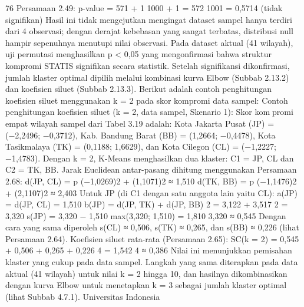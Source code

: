 76
Persamaan 2.49:
p-value =
571 + 1
1000 + 1
=
572
1001
= 0,5714 (tidak signifikan)
Hasil ini tidak mengejutkan mengingat dataset sampel hanya terdiri dari 4 observasi; dengan
derajat kebebasan yang sangat terbatas, distribusi null hampir sepenuhnya menutupi nilai
observasi. Pada dataset aktual (41 wilayah), uji permutasi menghasilkan p < 0,05 yang
mengonfirmasi bahwa struktur kompromi STATIS signifikan secara statistik.
Setelah signifikansi dikonfirmasi, jumlah klaster optimal dipilih melalui kombinasi
kurva Elbow (Subbab 2.13.2) dan koefisien siluet (Subbab 2.13.3). Berikut adalah contoh
penghitungan koefisien siluet menggunakan k = 2 pada skor kompromi data sampel:
Contoh penghitungan koefisien siluet (k = 2, data sampel, Skenario 1): Skor kompromi empat wilayah sampel dari Tabel 3.19 adalah: Kota Jakarta Pusat (JP) =
(−2,2496; −0,3712), Kab. Bandung Barat (BB) = (1,2664; −0,4478), Kota Tasikmalaya
(TK) = (0,1188; 1,6629), dan Kota Cilegon (CL) = (−1,2227; −1,4783). Dengan
k = 2, K-Means menghasilkan dua klaster: C1 = {JP, CL} dan C2 = {TK, BB}. Jarak
Euclidean antar-pasang dihitung menggunakan Persamaan 2.68:
d(JP, CL) = p
(−1,0269)2 + (1,1071)2 ≈ 1,510
d(TK, BB) = p
(−1,1476)2 + (2,1107)2 ≈ 2,403
Untuk JP (di C1 dengan satu anggota lain yaitu CL):
a(JP) = d(JP, CL) = 1,510
b(JP) = d(JP, TK) + d(JP, BB)
2
=
3,122 + 3,517
2
= 3,320
s(JP) = 3,320 − 1,510
max(3,320; 1,510) =
1,810
3,320
≈ 0,545
Dengan cara yang sama diperoleh s(CL) ≈ 0,506, s(TK) ≈ 0,265, dan s(BB) ≈ 0,226
(lihat Persamaan 2.64). Koefisien siluet rata-rata (Persamaan 2.65):
SC(k = 2) = 0,545 + 0,506 + 0,265 + 0,226
4
=
1,542
4
≈ 0,386
Nilai ini menunjukkan pemisahan klaster yang cukup pada data sampel. Langkah yang
sama diterapkan pada data aktual (41 wilayah) untuk nilai k = 2 hingga 10, dan hasilnya
dikombinasikan dengan kurva Elbow untuk menetapkan k = 3 sebagai jumlah klaster
optimal (lihat Subbab 4.7.1).
Universitas Indonesia


